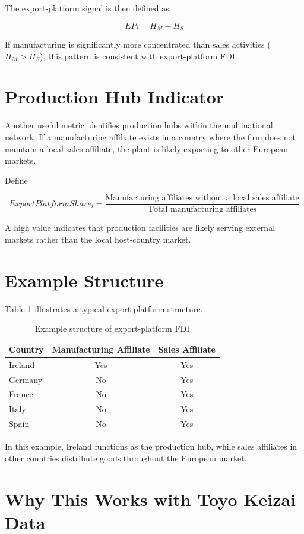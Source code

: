\documentclass[11pt]{article}
\begin{document}
The export-platform signal is then defined as

\[
EP_i = H_M - H_S
\]

If manufacturing is significantly more concentrated than sales activities (\(H_M > H_S\)), this pattern is consistent with export-platform FDI.

\section{Production Hub Indicator}

Another useful metric identifies production hubs within the multinational network. If a manufacturing affiliate exists in a country where the firm does not maintain a local sales affiliate, the plant is likely exporting to other European markets.

Define

\[
ExportPlatformShare_i =
\frac{\text{Manufacturing affiliates without a local sales affiliate}}
{\text{Total manufacturing affiliates}}
\]

A high value indicates that production facilities are likely serving external markets rather than the local host-country market.

\section{Example Structure}

Table \ref{tab:example} illustrates a typical export-platform structure.

\begin{table}[h]
\centering
\begin{tabular}{lcc}
\toprule
Country & Manufacturing Affiliate & Sales Affiliate \\
\midrule
Ireland & Yes & Yes \\
Germany & No & Yes \\
France & No & Yes \\
Italy & No & Yes \\
Spain & No & Yes \\
\bottomrule
\end{tabular}
\caption{Example structure of export-platform FDI}
\label{tab:example}
\end{table}

In this example, Ireland functions as the production hub, while sales affiliates in other countries distribute goods throughout the European market.

\section{Why This Works with Toyo Keizai Data}
\end{document}
